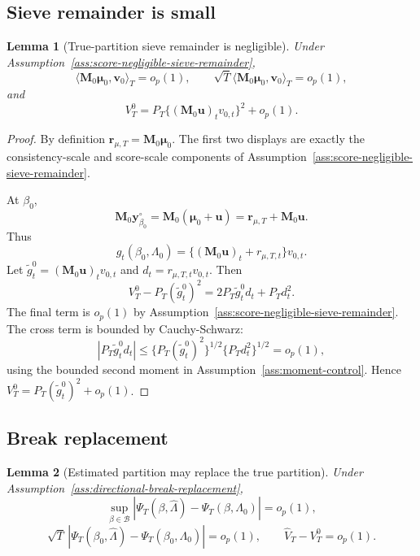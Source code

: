 \documentclass[12pt]{article}
\numberwithin{equation}{section}
\newtheorem{lemma}{Lemma}
\theoremstyle{definition}
\newcommand{\op}{o_p}
\newcommand{\innerT}[2]{\langle #1,#2\rangle_T}
\begin{document}
\subsection{Sieve remainder is small}

\begin{lemma}[True-partition sieve remainder is negligible]
\label{lem:part2-sieve-remainder}
Under Assumption~\ref{ass:score-negligible-sieve-remainder},
\[
    \innerT{\bm M_0\bm\mu_0}{\bm v_0}=\op(1),
    \qquad
    \sqrt T\innerT{\bm M_0\bm\mu_0}{\bm v_0}=\op(1),
\]
and
\[
    V_T^0
    =P_T\{(\bm M_0\bm u)_tv_{0,t}\}^2+\op(1).
\]
\end{lemma}

\begin{proof}
By definition \(\bm r_{\mu,T}=\bm M_0\bm\mu_0\). The first two displays are
exactly the consistency-scale and score-scale components of
Assumption~\ref{ass:score-negligible-sieve-remainder}.

At \(\beta_0\),
\[
    \bm M_0\bm y_{\beta_0}^\circ
    =\bm M_0(\bm\mu_0+\bm u)
    =\bm r_{\mu,T}+\bm M_0\bm u.
\]
Thus
\[
    g_t(\beta_0,\Lambda_0)
    =\{(\bm M_0\bm u)_t+r_{\mu,T,t}\}v_{0,t}.
\]
Let \(\tilde g_t^0=(\bm M_0\bm u)_tv_{0,t}\) and
\(d_t=r_{\mu,T,t}v_{0,t}\). Then
\[
    V_T^0-P_T(\tilde g_t^0)^2
    =2P_T\tilde g_t^0d_t+P_Td_t^2.
\]
The final term is \(\op(1)\) by Assumption~\ref{ass:score-negligible-sieve-remainder}.
The cross term is bounded by Cauchy-Schwarz:
\[
    |P_T\tilde g_t^0d_t|
    \le \{P_T(\tilde g_t^0)^2\}^{1/2}\{P_Td_t^2\}^{1/2}=\op(1),
\]
using the bounded second moment in Assumption~\ref{ass:moment-control}. Hence
\(V_T^0=P_T(\tilde g_t^0)^2+\op(1)\).
\end{proof}

\subsection{Break replacement}

\begin{lemma}[Estimated partition may replace the true partition]
\label{lem:part2-break-replacement}
Under Assumption~\ref{ass:directional-break-replacement},
\[
    \sup_{\beta\in\mathcal B}
    |\Psi_T(\beta,\widehat\Lambda)-\Psi_T(\beta,\Lambda_0)|=\op(1),
\]
\[
    \sqrt T\,
    |\Psi_T(\beta_0,\widehat\Lambda)-\Psi_T(\beta_0,\Lambda_0)|=\op(1),
    \qquad
    \widehat V_T-V_T^0=\op(1).
\]
\end{lemma}
\end{document}
